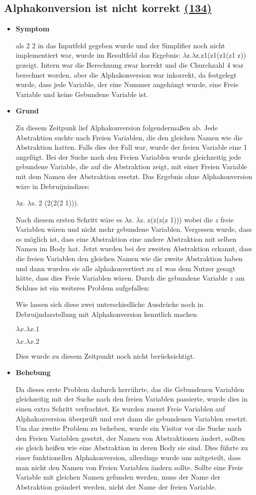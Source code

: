 \documentclass[parskip=full,11pt,twoside]{scrartcl}
\newcommand{\issueref}[1]{
    \href{https://git.scc.kit.edu/ap/Aurora/issues/#1}{(#1)}
}
\newcommand{\regrtest}[5]{
    \subsection{#1 \issueref{#2}}
    \begin{itemize}
        \item \textbf{Symptom}
            #3
        \item \textbf{Grund}
            #4
        \item \textbf{Behebung}
            #5
    \end{itemize}
}
\begin{document}
\regrtest{Alphakonversion ist nicht korrekt}{134}{
	als 2 2 in das Inputfeld gegeben wurde und der Simplifier noch nicht implementiert war, wurde im Resultfeld das
	Ergebnis: $\lambda$z.$\lambda$z.z1(z1(z1(z1 z)) gezeigt.
	Intern war die Berechnung zwar korrekt und die Churchzahl 4 war berechnet worden,
	aber die Alphakonversion war inkorrekt, da festgelegt wurde, dass jede
	Variable, der eine Nummer angehängt wurde, eine Freie Variable und keine Gebundene Variable ist.
}{
	Zu diesem Zeitpunk lief Alphakonversion folgendermaßen ab.
	Jede Abstraktion suchte nach Freien Variablen, die den gleichen Namen wie
	die Abstraktion hatten. Falls dies der Fall war, wurde der freien Variable eine 1 angefügt.
	Bei der Suche nach den Freien Variablen wurde gleichzeitig jede gebundene Variable, die auf die Abstraktion zeigt,
	mit einer Freien Variable mit dem Namen der Abstraktion ersetzt.
	Das Ergebnis ohne Alphakonversion wäre in Debruijnindizes:
	
	$\lambda$z. $\lambda$z. 2 (2(2(2 1))).
	
	Nach diesem ersten Schritt wäre es $\lambda$z. $\lambda$z. z(z(z(z 1))) wobei die $z$ freie Variablen wären und nicht
	mehr gebundene Variablen.
	Vergessen wurde, dass es möglich ist, dass eine Abstraktion eine andere Abstraktion mit selben Namen im Body hat.
	Jetzt wurden bei der zweiten Abstraktion erkannt, dass die freien Variablen den gleichen Namen wie die zweite
	Abstraktion haben und dann wurden sie alle alphakonvertiert zu z1 was dem Nutzer gesagt hätte, dass dies Freie
	Variablen wären. Durch die gebundene Variable $z$ am Schluss ist ein weiteres Problem aufgefallen:
	
	Wie lassen sich diese  zwei unterschiedliche Ausdrücke noch in Debruijndarstellung mit Alphakonversion
	kenntlich machen
	
	$\lambda x.\lambda x. 1$
	
	$\lambda x. \lambda x. 2$
	
	Dies wurde zu diesem Zeitpunkt noch nicht berücksichtigt.
}{
	Da dieses erste Problem dadurch herrührte, das die Gebundenen Variablen gleichzeitig mit der Suche nach den freien
	Variablen passierte, wurde dies in einen extra Schritt verfrachtet.
	Es wurden zuerst Freie Variablen auf Alphakonversion
	überprüft und erst dann die gebundenen Variablen ersetzt.
	Um das zweite Problem zu beheben, wurde ein Visitor vor die Suche nach den Freien Variablen gesetzt, der Namen von
	Abstraktionen ändert, sollten sie gleich heißen wie eine Abstraktion in deren Body sie sind.
	Dies führte zu einer funktionellen Alphakonversion, allerdings wurde uns mitgeteilt, dass man nicht den Namen von
	Freien Variablen ändern sollte.
	Sollte eine Freie Variable mit gleichen Namen gefunden werden, muss der Name der Abstraktion geändert werden, nicht
	der Name der freien Variable.
	
}
\end{document}
